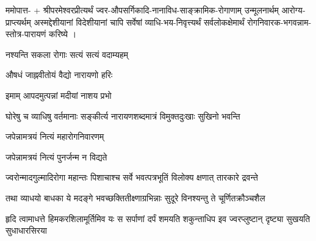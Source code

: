 

ममोपात्त- + श्रीपरमेश्वरप्रीत्यर्थं ज्वर-औपसर्गिकादि-नानाविध-साङ्क्रामिक-रोगाणाम् उन्मूलनार्थम् आरोग्य-प्राप्त्यर्थम् अस्मद्देशीयानां विदेशीयानां चापि सर्वेषां व्याधि-भय-निवृत्त्यर्थं सर्वलोकक्षेमार्थं रोगनिवारक-भगवन्नाम-स्तोत्र-पारायणं करिष्ये ।


{नश्यन्ति सकला रोगाः सत्यं सत्यं वदाम्यहम्}

{औषधं जाह्नवीतोयं वैद्यो नारायणो हरिः}

{इमाम् आपदमुत्पन्नां मदीयां नाशय प्रभो}

{घोरेषु च व्याधिषु वर्तमानाः}
{सङ्कीर्त्य नारायणशब्दमात्रं}
{विमुक्तदुःखाः सुखिनो भवन्ति}

{जपेन्नामत्रयं नित्यं महारोगनिवारणम्}

{जपेन्नामत्रयं नित्यं पुनर्जन्म न विद्यते}

{ज्वरोन्मादगुल्मादिरोगा महान्तः}
{पिशाचाश्च सर्वे भवत्पत्रभूतिं}
{विलोक्य क्षणात् तारकारे द्रवन्ते}

{तथा व्याधयो बाधका ये मदङ्गे}
{भवच्छक्तितीक्ष्णाग्रभिन्नाः सुदूरे}
{विनश्यन्तु ते चूर्णितक्रौञ्चशैल}

{हृदि त्वामाधत्ते हिमकरशिलामूर्तिमिव यः}
{स सर्पाणां दर्पं शमयति शकुन्ताधिप इव}
{ज्वरप्लुष्टान् दृष्ट्या सुखयति सुधाधारसिरया}%


